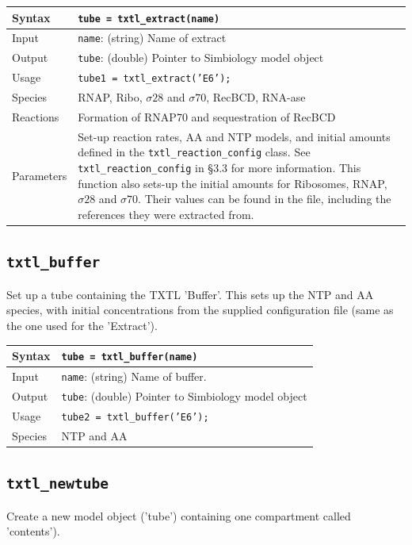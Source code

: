 \documentclass[english]{report}
\begin{document}
			\begin{tabular}{p{2cm}|p{13cm}}
			Syntax & \texttt{tube = txtl\_extract(name)}\\ \hline
			Input & \texttt{name}: (string) Name of extract \\ \hline
			Output & \texttt{tube}: (double) Pointer to Simbiology model object\\ \hline
			Usage & \texttt{tube1 = txtl\_extract('E6');}\\ \hline
			Species & RNAP, Ribo, $\sigma 28$ and $\sigma 70$, RecBCD, RNA-ase \\ \hline
			Reactions & Formation of RNAP70 and sequestration of RecBCD \\ \hline
			Parameters & Set-up reaction rates, AA and NTP models, and initial amounts defined in the \texttt{txtl\_reaction\_config} class. See \texttt{txtl\_reaction\_config} in \S 3.3 for more information. This function also sets-up the initial amounts for Ribosomes, RNAP,  $\sigma 28$ and $\sigma 70$. Their values can be found in the file, including the references they were extracted from. \\
			\end{tabular}
			
		\subsection*{\texttt{txtl\_buffer}}
		Set up a tube containing the TXTL 'Buffer'. This sets up the NTP and AA species, with initial concentrations from the supplied configuration file (same as the one used for the 'Extract'). \\
					
			\begin{tabular}{p{2cm}|p{13cm}}
			Syntax & \texttt{tube = txtl\_buffer(name)}\\ \hline
			Input & \texttt{name}: (string) Name of buffer. \\ \hline
			Output & \texttt{tube}: (double) Pointer to Simbiology model object\\ \hline
			Usage & \texttt{tube2 = txtl\_buffer('E6');}\\ \hline
			Species & NTP and AA \\
			\end{tabular}

		\subsection*{\texttt{txtl\_newtube}}	
		Create a new model object ('tube') containing one compartment called 'contents'). \\	
			
\end{document}
